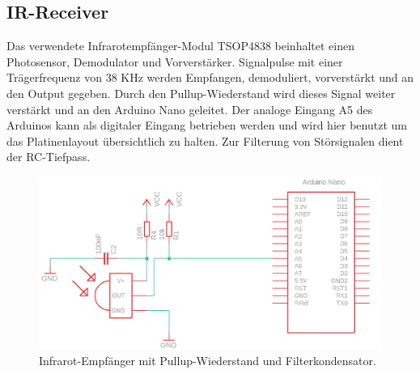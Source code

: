 \documentclass[11pt, titlepage, fleqn]{report}
\begin{document}
			\subsection{IR-Receiver}
				Das verwendete Infrarotempfänger-Modul TSOP4838 beinhaltet einen Photosensor, Demodulator und Vorverstärker. Signalpulse mit einer Trägerfrequenz von 38 KHz werden Empfangen, demoduliert, vorverstärkt und an den Output gegeben. Durch den Pullup-Wiederstand wird dieses Signal weiter verstärkt und an den Arduino Nano geleitet. Der analoge Eingang A5 des Arduinos kann als digitaler Eingang betrieben werden und wird hier benutzt um das Platinenlayout übersichtlich zu halten. Zur Filterung von Störsignalen dient der RC-Tiefpass.
				\begin{figure}[htbp]
					\centering
					\includegraphics[width=\linewidth]{./img/ir.png}
					\caption{ Infrarot-Empfänger mit Pullup-Wiederstand und Filterkondensator.
					\label{fig:imgIR}}
				\end{figure}
			\newpage	
\end{document}
